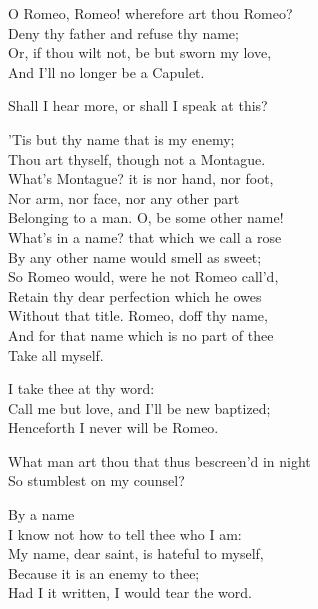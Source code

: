 \begin{speech}
O Romeo, Romeo! wherefore art thou Romeo? \\
Deny thy father and refuse thy name; \\
Or, if thou wilt not, be but sworn my love, \\
And I'll no longer be a Capulet. \\
\end{speech}
\begin{speech}
 Shall I hear more, or shall I speak at this?
\\
\end{speech}
\begin{speech}
'Tis but thy name that is my enemy; \\
Thou art thyself, though not a Montague. \\
What's Montague? it is nor hand, nor foot, \\
Nor arm, nor face, nor any other part \\
Belonging to a man.   O, be some other name! \\
What's in a name? that which we call a rose \\
By any other name would smell as sweet; \\
So Romeo would, were he not Romeo call'd, \\
Retain thy dear perfection which he owes \\
Without that title.   Romeo, doff thy name, \\
And for that name which is no part of thee \\
Take all myself. \\
\end{speech}
\begin{speech}
I take thee at thy word: \\
Call me but love, and I'll be new baptized; \\
Henceforth I never will be Romeo. \\
\end{speech}
\begin{speech}
What man art thou that thus bescreen'd in night \\

So stumblest on my counsel? \\
\end{speech}
\begin{speech}
By a name \\
I know not how to tell thee who I am: \\
My name, dear saint, is hateful to myself, \\
Because it is an enemy to thee; \\
Had I it written, I would tear the word. \\
\end{speech}
